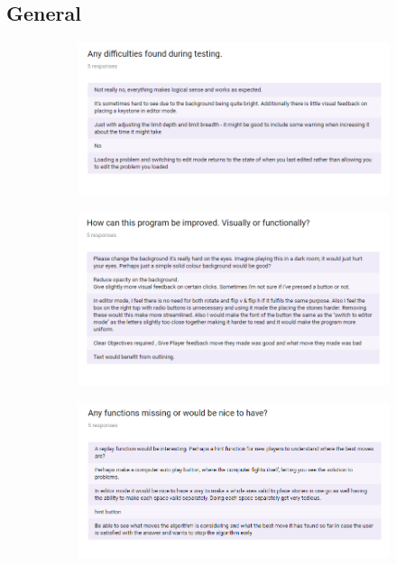 \documentclass{l4proj}
\begin{document}
\begin{appendices}
\section{General}

\begin{figure}[H]
\centering
\begin{subfigure}[b]{\textwidth}
\centering
\includegraphics[width=\textwidth]{A1-2/4.png}
\end{subfigure}
\end{figure}

\begin{figure}[H]
\centering
\begin{subfigure}[b]{\textwidth}
\centering
\includegraphics[width=\textwidth]{A1-2/5.png}
\end{subfigure}
\end{figure}



\begin{figure}[H]
\centering
\begin{subfigure}[b]{\textwidth}
\centering
\includegraphics[width=\textwidth]{A1-2/6.png}
\end{subfigure}
\end{figure}


\end{appendices}
\end{document}
